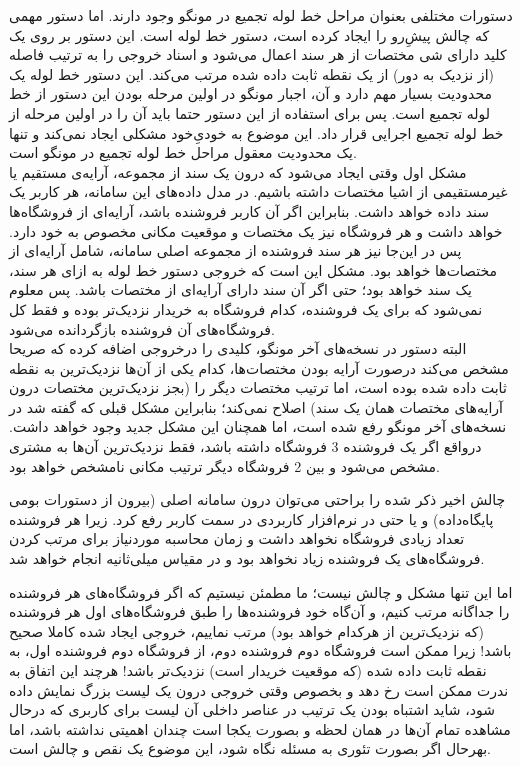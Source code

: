 دستورات مختلفی بعنوان مراحل خط لوله تجمیع در مونگو وجود دارند. اما دستور مهمی که چالش پیشِ‌رو را ایجاد کرده است،‌ دستور خط لوله  است. این دستور بر روی یک کلید دارای شی مختصات از هر سند اعمال می‌شود و اسناد خروجی را به ترتیب فاصله (از نزدیک به دور) از یک نقطه ثابت داده شده مرتب می‌کند. این دستور خط لوله یک محدودیت بسیار مهم دارد و آن، اجبار مونگو در اولین مرحله بودن این دستور از خط لوله تجمیع است. پس برای استفاده از این دستور حتما باید آن را در اولین مرحله از خط لوله تجمیع اجرایی قرار داد\cite{mongo:geo}. این موضوع به خودیِ‌خود مشکلی ایجاد نمی‌کند و تنها یک محدودیت معقول مراحل خط لوله تجمیع در مونگو است.\\

مشکل اول وقتی ایجاد می‌شود که درون یک سند از مجموعه، آرایه‌ی مستقیم یا غیرمستقیمی از اشیا مختصات داشته باشیم. در مدل داده‌های این سامانه، هر کاربر یک سند داده خواهد داشت. بنابراین اگر آن کاربر فروشنده باشد، آرایه‌ای از فروشگاه‌ها خواهد داشت و هر فروشگاه نیز یک مختصات و موقعیت مکانی مخصوص به خود دارد. پس در این‌جا نیز هر سند فروشنده از مجموعه اصلی سامانه، شامل آرایه‌ای از مختصات‌ها خواهد بود. مشکل این است که خروجی دستور خط لوله  به ازای هر سند، یک سند خواهد بود؛ حتی اگر آن سند دارای آرایه‌ای از مختصات باشد. پس معلوم نمی‌شود که برای یک فروشنده، کدام فروشگاه به خریدار نزدیک‌تر بوده و فقط کل فروشگاه‌های آن فروشنده بازگردانده می‌شود.\\

البته دستور  در نسخه‌های آخر مونگو، کلیدی را درخروجی اضافه کرده که صریحا مشخص می‌کند درصورت آرایه بودن مختصات‌ها، کدام یکی از آن‌ها نزدیک‌ترین به نقطه ثابت داده شده بوده است، اما ترتیب مختصات دیگر را (بجز نزدیک‌ترین مختصات درون آرایه‌های مختصات همان یک سند) اصلاح نمی‌کند\cite{mongo:geo}؛ بنابراین مشکل قبلی که گفته شد در نسخه‌های آخر مونگو رفع شده است، اما همچنان این مشکل جدید وجود خواهد داشت. درواقع اگر یک فروشنده 3 فروشگاه داشته باشد، فقط نزدیک‌ترین آن‌ها به مشتری مشخص می‌شود و بین 2 فروشگاه دیگر ترتیب مکانی نامشخص خواهد بود.

چالش اخیر ذکر شده را براحتی می‌توان درون سامانه اصلی (بیرون از دستورات بومی پایگاه‌داده) و یا حتی در نرم‌افزار کاربردی در سمت کاربر رفع کرد. زیرا هر فروشنده تعداد زیادی فروشگاه نخواهد داشت و زمان محاسبه موردنیاز برای مرتب کردن فروشگاه‌های یک فروشنده زیاد نخواهد بود و در مقیاس میلی‌ثانیه انجام خواهد شد.

\newpage

اما این تنها مشکل و چالش نیست؛ ما مطمئن نیستیم که اگر فروشگاه‌های هر فروشنده را جداگانه مرتب کنیم، و آن‌گاه خود فروشنده‌ها را طبق فروشگاه‌های اول هر فروشنده (که نزدیک‌ترین از هرکدام خواهد بود) مرتب نماییم، خروجی ایجاد شده کاملا صحیح باشد! زیرا ممکن است فروشگاه دوم  فروشنده دوم، از فروشگاه دوم فروشنده اول،‌ به نقطه ثابت داده شده (که موقعیت خریدار است) نزدیک‌تر باشد! هرچند این اتفاق به ندرت ممکن است رخ دهد و بخصوص وقتی خروجی درون یک لیست بزرگ نمایش داده شود، شاید اشتباه بودن یک ترتیب در عناصر داخلی آن لیست برای کاربری که درحال مشاهده تمام آن‌ها در همان لحظه و بصورت یکجا است چندان اهمیتی نداشته باشد، اما بهرحال اگر بصورت تئوری به مسئله نگاه شود، این موضوع یک نقص و چالش است.

